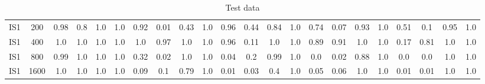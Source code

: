 \documentclass[10pt]{article}
\begin{document}
\begin{table}
\begin{tabular}{ cc||c c c c | c c c c | c c c c | c c c c| c c c c}
 					IS1 & 200 & 0.98 & 0.8 & 1.0 & 1.0 & 0.92 & 0.01 & 0.43 & 1.0& 0.96 & 0.44 & 0.84 & 1.0& 0.74 & 0.07 & 0.93 & 1.0 & 0.51 & 0.1 & 0.95 & 1.0\\ 
 					IS1 & 400 & 1.0 & 1.0 & 1.0 & 1.0 & 1.0 & 0.97 & 1.0 & 1.0& 0.96 & 0.11 & 1.0 & 1.0& 0.89 & 0.91 & 1.0 & 1.0 & 0.17 & 0.81 & 1.0 & 1.0\\ 
 					IS1 & 800 & 0.99 & 1.0 & 1.0 & 1.0 & 0.32 & 0.02 & 1.0 & 1.0& 0.04 & 0.2 & 0.99 & 1.0& 0.0 & 0.02 & 0.88 & 1.0 & 0.0 & 0.0 & 1.0 & 1.0\\ 
 					IS1 & 1600 & 1.0 & 1.0 & 1.0 & 1.0 & 0.09 & 0.1 & 0.79 & 1.0& 0.01 & 0.03 & 0.4 & 1.0& 0.05 & 0.06 & 1.0 & 1.0 & 0.01 & 0.01 & 1.0 & 1.0\\ \hline
 \hline
  \end{tabular}
  \caption{Test data}
\end{table}


\newpage
\end{document}
